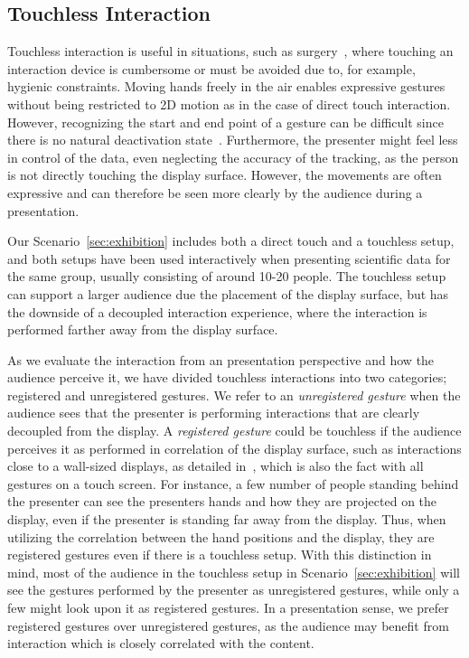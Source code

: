 \documentclass[journal]{vgtc}                %
\begin{document}
\subsection{Touchless Interaction}\label{subsec:touchless}
Touchless interaction is useful in situations, such as surgery~\cite{Mentis:2012:IPI:2207676.2208536}, where touching an interaction device is cumbersome or must be avoided due to, for example, hygienic constraints.
Moving hands freely in the air enables expressive gestures without being restricted to 2D motion as in the case of direct touch interaction.
However, recognizing the start and end point of a gesture can be difficult since there is no natural deactivation state~\cite{Kirmizibayrak:2011:EGB:2087756.2087764}.
Furthermore, the presenter might feel less in control of the data, even neglecting the accuracy of the tracking, as the person is not directly touching the display surface.
However, the movements are often expressive and can therefore be seen more clearly by the audience during a presentation.

Our Scenario~\ref{sec:exhibition} includes both a direct touch and a touchless setup, and both setups have been used interactively when presenting scientific data for the same group, usually consisting of around 10-20 people.
The touchless setup can support a larger audience due the placement of the display surface, but has the downside of a decoupled interaction experience, where the interaction is performed farther away from the display surface.

As we evaluate the interaction from an presentation perspective and how the audience perceive it, we have divided touchless interactions into two categories; registered and unregistered gestures.
We refer to an \emph{unregistered gesture} when the audience sees that the presenter is performing interactions that are clearly decoupled from the display. 
A \emph{registered gesture} could be touchless if the audience perceives it as performed in correlation of the display surface, such as interactions close to a wall-sized displays, as detailed in~\cite{Bezerianos:2007:DSU:1467769}, which is also the fact with all gestures on a touch screen. 
For instance, a few number of people standing behind the presenter can see the presenters hands and how they are projected on the display, even if the presenter is standing far away from the display.
Thus, when utilizing the correlation between the hand positions and the display, they are registered gestures even if there is a touchless setup.
With this distinction in mind, most of the audience in the touchless setup in Scenario~\ref{sec:exhibition} will see the gestures performed by the presenter as unregistered gestures, while only a few might look upon it as registered gestures.
In a presentation sense, we prefer registered gestures over unregistered gestures, as the audience may benefit from interaction which is closely correlated with the content.
 
\end{document}
